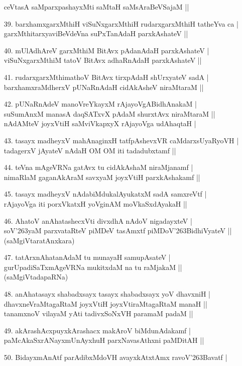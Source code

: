 \begin{itemize}
ceVtasA saMparxpashayxMti saMtaH saMsAraBeVSajaM ||
\item[39.] barxhamxgarxMthiH viSuNxgarxMthiH rudarxgarxMthiH tatheYva ca |\\
garxMthitarxyaviBeVdeVna suPxTanAdaH parxkAshateV ||
\item[40.] mUlAdhAreV garxMthiM BitAvx pAdanAdaH parxkAshateV |\\
viSuNxgarxMthiM tatoV BitAvx adhaRnAdaH parxkAshateV ||
\item[41.] rudarxgarxMthimathoV BitAvx tirxpAdaH shUrxyateV sadA |\\
barxhamxraMdherxV pUNaRnAdaH cidAkAsheV niraMtaraM ||
\item[42.] pUNaRnAdeV manoVreYkayxM rAjayoVgABidhAnakaM |\\
suSumAnxM manasA daqSATxvX pAdaM shurxtAvx niraMtaraM ||\\
nAdAMteV joyxVtiH saMviVkapxyX rAjayoVga udAhaqtaH |
\item[43.] tasayx madheyxV mahAnaginxH tatfpAshevxVR caMdarxsUyaRyoVH |\\
tadagerxV jAyateV nAdaH OM OM iti tadadubxtamf ||
\item[44.] teVna mAgeVRNa gatAvx tu cidAkAshaM niraMjanamf |\\
nimaRlaM gaganAkAraM savxyaM joyxVtiH parxkAshakamf ||
\item[45.] tasayx madheyxV nAdabiMdukalAyukatxM sadA samxreVtf |\\
rAjayoVga iti porxVkatxH yoVginAM moVkaSxdAyakaH ||
\item[46.] AhatoV anAhatashecxVti divxdhA nAdoV nigadayxteV |\\
soV\char'263yaM parxvataRteV piMDeV tasAmxtf piMDoV\char'263BidhiVyateV ||
\hfill{(saMgiVtaratAnxkara)} 
\item[47.] tatArxnAhatanAdaM tu munayaH samupAsateV |\\
gurUpadiSaTxmAgeVRNa mukitxdaM na tu raMjakaM ||
\hfill{(saMgiVtadapaRNa)}
\item[48.] anAhatasayx shabadxsayx tasayx shabadxsayx yoV dhavxniH |\\
dhavxneVraMtagaRtaM joyxVtiH joyxVtiraMtagaRtaM manaH ||\\
tanamxnoV vilayaM yAti tadivxSoNxVH paramaM padaM ||
\item[49.] akArashAcxpuyxkArashacx makAroV biMdunAdakamf |\\
paMcAkaSxrANayxmUnAyxhuH parxNavasAthxni paMDitAH ||
\item[50.] BidayxmAnAtf parAdibxMdoVH avayxkAtxtAmx ravoV\char'263Bavatf |\\

\end{itemize}
